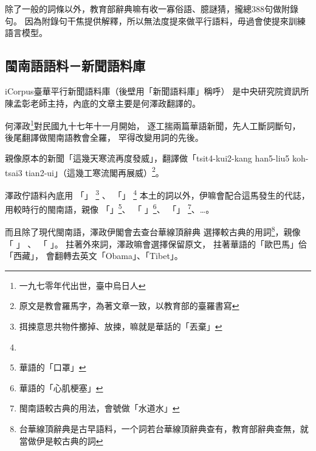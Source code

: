 除了一般的詞條以外，教育部辭典嘛有收一寡俗語、臆謎猜，攏總388句做附錄句。
因為附錄句干焦提供解釋，所以無法度提來做平行語料，毋過會使提來訓練語言模型。


\subsection{閩南語語料－新聞語料庫}
\label{節：新聞語料庫}
iCorpus臺華平行新聞語料庫（後壁用「新聞語料庫」稱呼）\cite{iCorpus臺華平行新聞語料庫}
是中央研究院資訊所陳孟彰老師主持，內底的文章主要是何澤政翻譯的。

何澤政\footnote{一九七零年代出世，臺中烏日人}對民國九十七年十一月開始，
逐工揣兩篇華語新聞，先人工斷詞斷句，
後尾翻譯做閩南語教會全羅，
罕得改變用詞的先後。

親像原本的新聞「這幾天寒流再度發威」，翻譯做「tsit4-kui2-kang han5-liu5 koh-tsai3 tian2-ui」（這幾工寒流閣再展威）\footnote{原文是教會羅馬字，為著文章一致，以教育部的臺羅書寫}。

澤政佇語料內底用
「」
\footnote{挕捒意思共物件擲掉、放捒，嘛就是華話的「丟棄」
}
、
「」
\footnote{
}
本土的詞以外，伊嘛會配合這馬發生的代誌，用較時行的閩南語，親像
「」\footnote{華語的「口罩」}、
「
」\footnote{華語的「心肌梗塞」}、
「」
\footnote{閩南語較古典的用法，會號做「水道水」}、…。

而且除了現代閩南語，澤政伊閣會去查台華線頂辭典\cite{台華線頂辭典}
選擇較古典的用詞\footnote{台華線頂辭典是古早語料，一个詞若台華線頂辭典查有，教育部辭典查無，就當做伊是較古典的詞}，親像
「
」
、
「
」。
拄著外來詞，澤政嘛會選擇保留原文，
拄著華語的「歐巴馬」佮「西藏」，
會翻轉去英文「Obama」、「Tibet」。

